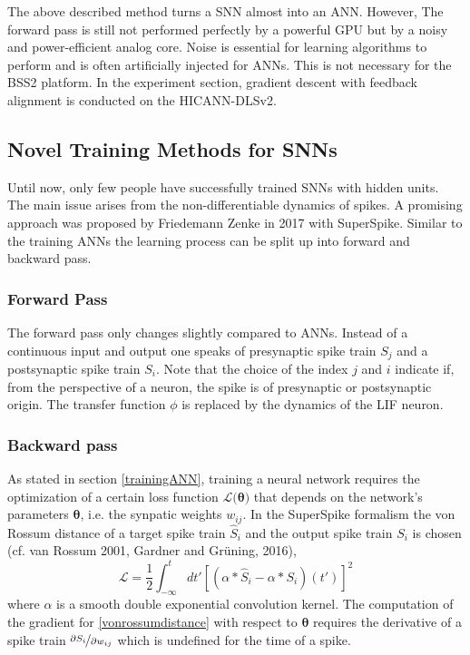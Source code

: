 The above described method turns a SNN almost into an ANN. However, The forward pass is still not performed perfectly by a powerful GPU but by a noisy and power-efficient analog core. Noise is essential for learning algorithms to perform and is often artificially injected for ANNs. This is not necessary for the BSS2 platform. In the experiment section, gradient descent with feedback alignment is conducted on the HICANN-DLSv2.


\subsection{Novel Training Methods for SNNs}


Until now, only few people have successfully trained SNNs with hidden units. The main issue arises from the non-differentiable dynamics of spikes. A promising approach was proposed by Friedemann Zenke in 2017 with SuperSpike. Similar to the training ANNs the learning process can be split up into forward and backward pass. 

\subsubsection*{Forward Pass}
The forward pass only changes slightly compared to ANNs. Instead of a continuous input and output one speaks of presynaptic spike train $S_j$ and a postsynaptic spike train $S_i$. Note that the choice of the index $j$ and $i$ indicate if, from the perspective of a neuron, the spike is of presynaptic or postsynaptic origin. The transfer function $\phi$ is replaced by the dynamics of the LIF neuron.


\subsubsection*{Backward pass}

As stated in section \ref{trainingANN}, training a neural network requires the optimization of a certain loss function $\mathcal{L(\mathbf{\theta)}}$ that depends on the network's parameters $\mathbf{\theta}$, i.e. the synpatic weights $w_{ij}$. In the SuperSpike formalism the von Rossum distance of a target spike train $\hat{S}_i$ and the output spike train $S_i$ is chosen (cf. van Rossum 2001, Gardner and Grüning, 2016),
\begin{equation}
\label{vonrossumdistance}
\mathcal{L} = \frac{1}{2} \int^t_{-\infty}dt' \left[\left(\alpha \ast \hat{S}_i - \alpha \ast S_i \right)(t')\right]^2
\end{equation}
where $\alpha$ is a smooth double exponential convolution kernel. The computation of the gradient for \ref{vonrossumdistance} with respect to $\mathbf{\theta}$ requires the derivative of a spike train $\nicefrac{\partial{S_i}}{\partial{w_{ij}}}$ which is undefined for the time of a spike. 

